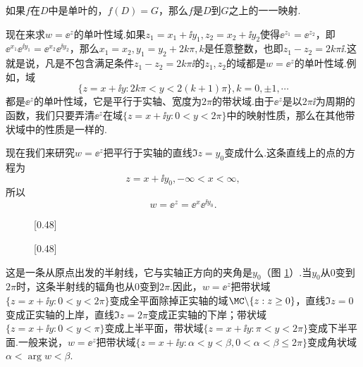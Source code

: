 如果$f$在$D$中是单叶的，$f(D)=G$，那么$f$是$D$到$G$之上的一一映射.

现在来求$w=\ee^z$的单叶性域.如果$z_1=x_1+\ii y_1,z_2=x_2+\ii y_2$使得$\ee^{z_1}=\ee^{z_2} $，即$\ee^{x_1}\ee^{\ii y_1}=\ee^{x_2}\ee^{\ii y_2}$，那么$x_1=x_2,y_1=y_2+2k\pi,k$是任意整数，也即$z_1-z_2=2k\pi\ii$.这就是说，凡是不包含满足条件$z_1-z_2=2k\pi\ii$的$z_1,z_2$的域都是$w=\ee^z$的单叶性域.例如，域
\[\{z=x+\ii y:2k\pi<y<2(k+1)\pi\},k=0,\pm1,\cdots\]
都是$\ee^z$的单叶性域，它是平行于实轴、宽度为$2\pi$的带状域.由于$\ee^z$是以$2\pi\ii$为周期的函数，我们只要弄清$\ee^z$在域$\{z=x+\ii y:0<y<2\pi\}$中的映射性质，那么在其他带状域中的性质是一样的.

现在我们来研究$w=\ee^z$把平行于实轴的直线$\Im z=y_0$变成什么.这条直线上的点的方程为
\[z=x+\ii y_0,-\infty<x<\infty,\]
所以
\[w=\ee^z=\ee^x\ee^{\ii y_0}.\]
\begin{figure}[!ht]
\centering
\subcaptionbox{\label{fig2.4a}}[0.48\textwidth]
{
}
\subcaptionbox{\label{fig2.4b}}[0.48\textwidth]
{
}
\caption{\label{fig2.4}}
\end{figure}
这是一条从原点出发的半射线，它与实轴正方向的夹角是$y_0$（图 \ref{fig2.4}）.当$y_0$从$0$变到$2\pi$时，这条半射线的辐角也从$0$变到$2\pi$.因此，$w=\ee^z$把带状域$\{z=x+\ii y:0<y<2\pi\}$变成全平面除掉正实轴的域$\MC\backslash\{z:z\ge0\}$，直线$\Im z=0$变成正实轴的上岸，直线$\Im z=2\pi$变成正实轴的下岸；带状域$\{z=x+\ii y:0<y<\pi\}$变成上半平面，带状域$\{z=x+\ii y:\pi<y<2\pi\}$变成下半平面.一般来说，$w=\ee^z$把带状域$\{z=x+\ii y:\alpha<y<\beta,0<\alpha<\beta\le2\pi\}$变成角状域$\alpha<\arg w<\beta$.

